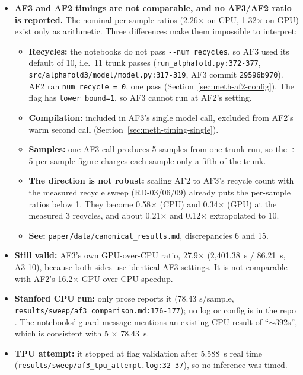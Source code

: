 \begin{itemize}
  \item \textbf{AF3 and AF2 timings are not comparable, and no AF3/AF2 ratio is reported.}
    The nominal per-sample ratios (2.26$\times$ on CPU, 1.32$\times$ on GPU) exist only as
    arithmetic. Three differences make them impossible to interpret:
    \begin{itemize}
      \item \textbf{Recycles:} the notebooks do not pass \texttt{-{}-num\_recycles}, so AF3 used its
        default of 10, i.e.\ 11 trunk passes (\texttt{run\_\allowbreak{}alphafold.py:372-377},
        \texttt{src/\allowbreak{}alphafold3/\allowbreak{}model/\allowbreak{}model.py:317-319}, AF3 commit \texttt{29596b970}). AF2 ran
        \texttt{num\_recycle = 0}, one pass (Section~\ref{sec:meth-af2-config}). The flag has \texttt{lower\_bound=1}, so AF3 cannot
        run at AF2's setting.
      \item \textbf{Compilation:} included in AF3's single model call, excluded from AF2's warm
        second call (Section~\ref{sec:meth-timing-single}).
      \item \textbf{Samples:} one AF3 call produces 5 samples from one trunk run, so the $\div$ 5
        per-sample figure charges each sample only a fifth of the trunk.
      \item \textbf{The direction is not robust:} scaling AF2 to AF3's recycle count with the
        measured recycle sweep (RD-03/06/09) already puts the per-sample ratios below 1.
        They become 0.58$\times$ (CPU) and 0.34$\times$ (GPU) at the measured 3 recycles, and about
        0.21$\times$ and 0.12$\times$ extrapolated to 10.
      \item \textbf{See:} \texttt{paper/\allowbreak{}data/\allowbreak{}canonical\_\allowbreak{}results.md}, discrepancies 6 and 15.
    \end{itemize}
  \item \textbf{Still valid:} AF3's own GPU-over-CPU ratio, 27.9$\times$ (2,401.38~s / 86.21~s,
    A3-10), because both sides use identical AF3 settings. It is not comparable with
    AF2's 16.2$\times$ GPU-over-CPU speedup.
  \item \textbf{Stanford CPU run:} only prose reports it (78.43 s/sample,
    \texttt{results/\allowbreak{}sweep/\allowbreak{}af3\_\allowbreak{}comparison.md:176-177}); no log or config is in the repo
    . The notebooks' guard message mentions an existing CPU result
    of ``$\sim$392s'', which is consistent with 5 $\times$ 78.43~s.
  \item \textbf{TPU attempt:} it stopped at flag validation after 5.588~s real time
    (\texttt{results/\allowbreak{}sweep/\allowbreak{}af3\_\allowbreak{}tpu\_\allowbreak{}attempt.log:32-37}), so no inference was timed.
\end{itemize}

